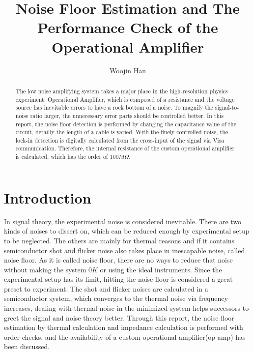 \documentclass{article}
\begin{document}
\title{Noise Floor Estimation and The Performance Check of the Operational Amplifier}
\author[1]{Woojin Han}
\maketitle

\begin{abstract}
    The low noise amplifying system takes a major place in the high-resolution physics experiment.
    Operational Amplifier, which is composed of a resistance and the voltage source has inevitable errors to have a rock bottom of a noise.
    To magnify the signal-to-noise ratio larger, the unnecessary error parts should be controlled better.
    In this report, the noise floor detection is performed by changing the capacitance value of the circuit, detailly the length of a cable is varied.
    With the finely controlled noise, the lock-in detection is digitally calculated from the cross-input of the signal via Visa communication.
    Therefore, the internal resistance of the custom operational amplifier is calculated, which has the order of $100 M \Omega$.
\end{abstract}


\section{Introduction}
In signal theory, the experimental noise is considered inevitable.
There are two kinds of noises to dissert on, which can be reduced enough by experimental setup to be neglected.
The others are mainly for thermal reasons and if it contains semiconductor shot and flicker noise also takes place in inescapable noise, called noise floor.
As it is called noise floor, there are no ways to reduce that noise without making the system $0K$ or using the ideal instruments.
Since the experimental setup has its limit, hitting the noise floor is considered a great preset to experiment.
The shot and flicker noises are calculated in a semiconductor system, which converges to the thermal noise via frequency increases, dealing with thermal noise in the minimized system helps successors to greet the signal and noise theory better.
Through this report, the noise floor estimation by thermal calculation and impedance calculation is performed with order checks, and the availability of a custom operational amplifier(op-amp) has been discussed.
\end{document}
